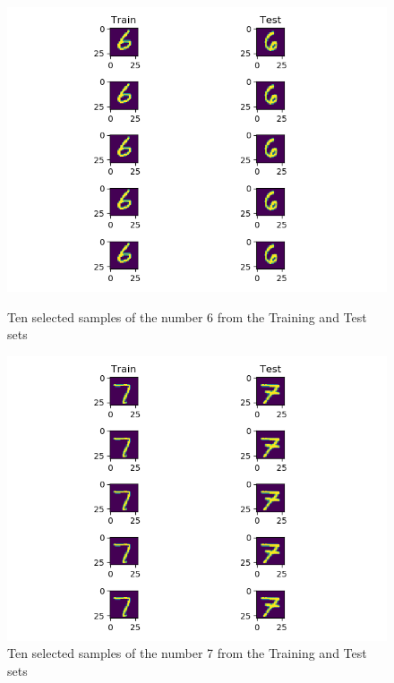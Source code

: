 \documentclass[10pt,letterpaper]{article}
\begin{document}
	\begin{figure}[H]
		\centering
		\includegraphics[width=\linewidth]{imgs/digit-6}
		\caption{Ten selected samples of the number 6 from the Training and Test sets}
		\label{fig:digit-6}
		\endminipage\hfill
		\centering
		\includegraphics[width=\linewidth]{imgs/digit-7}
		\caption{Ten selected samples of the number 7 from the Training and Test sets}
		\label{fig:digit-7}
		\endminipage\hfill
	\end{figure}
\end{document}
